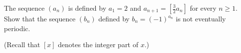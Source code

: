 The sequence $(a_n)$ is defined by $a_1 = 2$ and $a_{n+1} = \left[\frac{3}{2}a_n\right]$ for every $n \geq 1$. Show that the sequence $(b_n)$ defined by $b_n = (-1)^{a_n}$ is not eventually periodic.

(Recall that $[x]$ denotes the integer part of $x$.)
